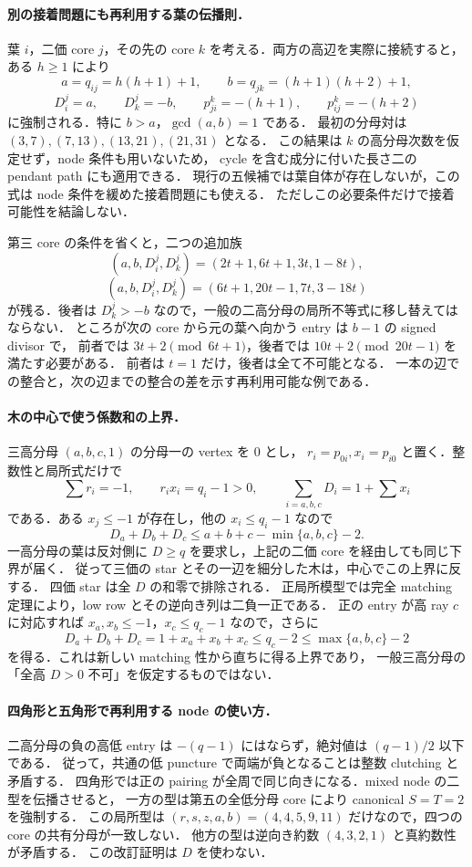 

\paragraph{別の接着問題にも再利用する葉の伝播則．}
葉 $i$，二価 core $j$，その先の core $k$ を考える．両方の高辺を実際に接続すると，
ある $h\geq1$ により
\[
 a=q_{ij}=h(h+1)+1,\qquad b=q_{jk}=(h+1)(h+2)+1,
\]
\[
 D^j_i=a,\qquad D^j_k=-b,\qquad
 p^k_{ji}=-(h+1),\qquad p^k_{ij}=-(h+2)
\]
に強制される．特に $b>a$，$\gcd(a,b)=1$ である．
最初の分母対は $(3,7),(7,13),(13,21),(21,31)$ となる．
この結果は $k$ の高分母次数を仮定せず，node 条件も用いないため，
cycle を含む成分に付いた長さ二の pendant path にも適用できる．
現行の五候補では葉自体が存在しないが，この式は node 条件を緩めた接着問題にも使える．
ただしこの必要条件だけで接着可能性を結論しない．

第三 core の条件を省くと，二つの追加族
\[
 (a,b,D^j_i,D^j_k)=(2t+1,6t+1,3t,1-8t),
\]
\[
 (a,b,D^j_i,D^j_k)=(6t+1,20t-1,7t,3-18t)
\]
が残る．後者は $D^j_k>-b$ なので，一般の二高分母の局所不等式に移し替えてはならない．
ところが次の core から元の葉へ向かう entry は $b-1$ の signed divisor で，
前者では $3t+2\pmod{6t+1}$，後者では $10t+2\pmod{20t-1}$ を満たす必要がある．
前者は $t=1$ だけ，後者は全て不可能となる．
一本の辺での整合と，次の辺までの整合の差を示す再利用可能な例である．

\paragraph{木の中心で使う係数和の上界．}
三高分母 $(a,b,c,1)$ の分母一の vertex を $0$ とし，
$r_i=p_{0i},x_i=p_{i0}$ と置く．整数性と局所式だけで
\[
 \sum r_i=-1,\qquad r_ix_i=q_i-1>0,\qquad
 \sum_{i=a,b,c}D_i=1+\sum x_i
\]
である．ある $x_j\leq-1$ が存在し，他の $x_i\leq q_i-1$ なので
\[
 D_a+D_b+D_c\leq a+b+c-\min\{a,b,c\}-2.
\]
一高分母の葉は反対側に $D\geq q$ を要求し，上記の二価 core を経由しても同じ下界が届く．
従って三価の star とその一辺を細分した木は，中心でこの上界に反する．
四価 star は全 $D$ の和零で排除される．
正局所模型では完全 matching 定理により，low row とその逆向き列は二負一正である．
正の entry が高 ray $c$ に対応すれば $x_a,x_b\le-1$，$x_c\le q_c-1$ なので，さらに
\[
 D_a+D_b+D_c=1+x_a+x_b+x_c\le q_c-2\le\max\{a,b,c\}-2
\]
を得る．これは新しい matching 性から直ちに得る上界であり，
一般三高分母の「全高 $D>0$ 不可」を仮定するものではない．

\paragraph{四角形と五角形で再利用する node の使い方．}
二高分母の負の高低 entry は $-(q-1)$ にはならず，絶対値は $(q-1)/2$ 以下である．
従って，共通の低 puncture で両端が負となることは整数 clutching と矛盾する．
四角形では正の pairing が全周で同じ向きになる．mixed node の二型を伝播させると，
一方の型は第五の全低分母 core により canonical $S=T=2$ を強制する．
この局所型は $(r,s,z,a,b)=(4,4,5,9,11)$ だけなので，四つの core の共有分母が一致しない．
他方の型は逆向き約数 $(4,3,2,1)$ と真約数性が矛盾する．
この改訂証明は $D$ を使わない．

